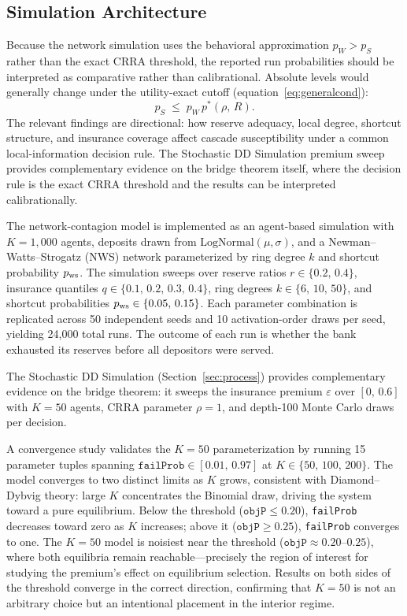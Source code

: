 
\subsection{Simulation Architecture}

Because the network simulation uses the behavioral approximation $p_W > p_S$
rather than the exact CRRA threshold, the reported run probabilities should be
interpreted as comparative rather than calibrational. Absolute levels
would generally change under the utility-exact cutoff
(equation~\eqref{eq:generalcond}):
%
\[
  p_S \;\leq\; p_W\,p^*(\rho,\,R).
\]
The relevant findings are directional: how reserve adequacy, local
degree, shortcut structure, and insurance coverage affect cascade
susceptibility under a common local-information decision rule.
The Stochastic DD Simulation premium sweep provides complementary evidence on the
bridge theorem itself, where the decision rule is the exact CRRA
threshold and the results can be interpreted calibrationally.

The network-contagion model is implemented as an agent-based simulation
with $K = 1{,}000$ agents, deposits drawn from
$\mathrm{LogNormal}(\mu, \sigma)$, and a Newman--Watts--Strogatz
(NWS) network \citep{newman1999renormalization} parameterized by ring
degree $k$ and shortcut probability $p_{\rm ws}$. The simulation sweeps
over reserve ratios $r \in \{0.2,\, 0.4\}$, insurance quantiles
$q \in \{0.1,\, 0.2,\, 0.3,\, 0.4\}$, ring degrees $k \in \{6,\, 10,\, 50\}$,
and shortcut probabilities $p_{\rm ws} \in \{0.05,\, 0.15\}$. Each
parameter combination is replicated across 50 independent seeds and
10 activation-order draws per seed, yielding 24{,}000 total runs.
The outcome of each run is whether the bank exhausted its reserves
before all depositors were served.

The Stochastic DD Simulation (Section~\ref{sec:process}) provides complementary
evidence on the bridge theorem: it sweeps the insurance premium
$\varepsilon$ over $[0,\, 0.6]$ with $K = 50$ agents, CRRA parameter
$\rho = 1$, and depth-100 Monte Carlo draws per decision.

A convergence study validates the $K = 50$ parameterization by
running 15 parameter tuples spanning $\texttt{failProb} \in [0.01,\,
0.97]$ at $K \in \{50,\, 100,\, 200\}$. The model converges to two
distinct limits as $K$ grows, consistent with Diamond--Dybvig theory:
large $K$ concentrates the Binomial draw, driving the system toward a
pure equilibrium. Below the threshold ($\texttt{objP} \leq 0.20$),
\texttt{failProb} decreases toward zero as $K$ increases; above it
($\texttt{objP} \geq 0.25$), \texttt{failProb} converges to one.
The $K = 50$ model is noisiest near the threshold
($\texttt{objP} \approx 0.20$--$0.25$), where both equilibria remain
reachable---precisely the region of interest for studying the
premium's effect on equilibrium selection. Results on both sides of
the threshold converge in the correct direction, confirming that
$K = 50$ is not an arbitrary choice but an intentional placement in
the interior regime.

